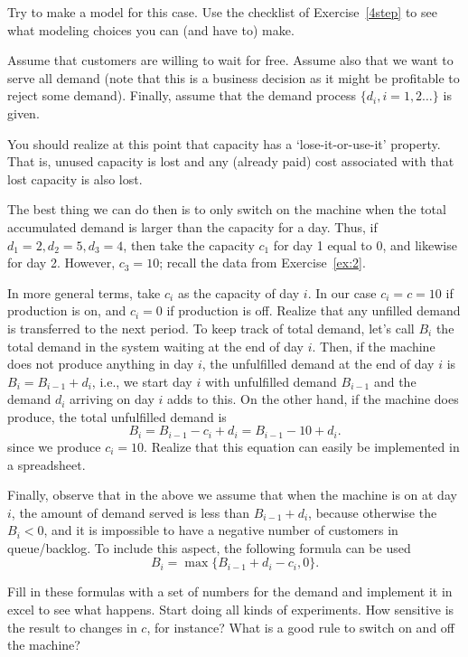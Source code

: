\begin{exercise}\label{ex:3}
  Try to make a model for this case.  Use the checklist of Exercise~\ref{4step} to see what
  modeling choices you can (and have to) make.
  \begin{solution}
    Assume that customers are willing to wait for free.  Assume also
    that we want to serve all demand (note that this is a business
    decision as it might be profitable to reject some demand). Finally,
    assume that the demand process $\{d_i, i=1,2\ldots\}$ is given.

    You should realize at this point that capacity has a
    `lose-it-or-use-it' property. That is, unused capacity is lost and any
    (already paid) cost associated with that lost capacity is also lost.

    The best thing we can do then is to only switch on the machine
    when the total accumulated demand is larger than the capacity for
    a day.  Thus, if $d_1=2, d_2 = 5, d_3 = 4$, then take the capacity
    $c_1$ for day 1 equal to 0, and likewise for day 2. However,
    $c_3 =10$; recall the data from Exercise~\ref{ex:2}.

In more general terms,   take $c_i$ as the capacity of day $i$. In our case $c_i=c=10$ if
  production is on, and $c_i=0$ if production is off.  Realize that
  any unfilled demand is transferred to the next period. To keep track
  of total demand, let's call $B_i$ the total demand in the system
  waiting at the end of day $i$. %
Then, if the machine  does not produce anything in day $i$, the unfulfilled demand at the
  end of day $i$ is $B_i=B_{i-1}+d_i$, i.e., we start day $i$ with
  unfulfilled demand $B_{i-1}$ and the demand $d_i$ arriving on
  day $i$ adds to this. On the other hand, if the machine does produce, the total
  unfulfilled demand is
  \begin{equation*}
B_i = B_{i-1}-c_i + d_i =  B_{i-1} -10 + d_i.
  \end{equation*}
  since we produce $c_i=10$. Realize that this equation can easily be
  implemented in a spreadsheet.

Finally, observe that in the above we assume that when the machine is
on at day $i$, the  amount of demand served is  less than $B_{i-1}+d_i$, because otherwise
the $B_i<0$, and it is impossible to have a negative number of
customers in queue/backlog. To include this aspect,  the following formula can be used
    \begin{equation*}
    B_i = \max\{B_{i-1} + d_i - c_i, 0\}.
    \end{equation*}

    Fill in these formulas with a set of numbers for the demand and
    implement it in excel to see what happens.  Start doing all kinds
    of experiments. How sensitive is the result to changes in $c$, for
    instance? What is a good rule to switch on and off the machine?
  \end{solution}
\end{exercise}

